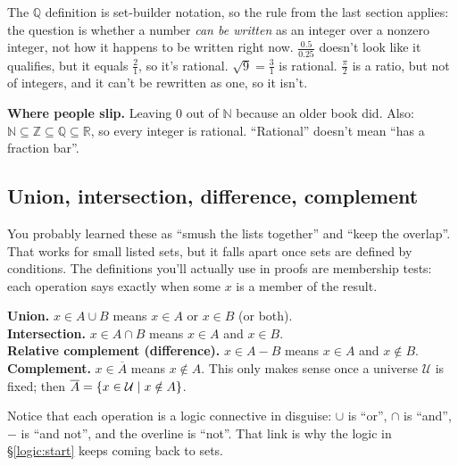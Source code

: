 The $\mathbb{Q}$ definition is set-builder notation, so the rule from the last section applies: the question is whether a number \emph{can be written} as an integer over a nonzero integer, not how it happens to be written right now. $\frac{0.5}{0.25}$ doesn't look like it qualifies, but it equals $\frac21$, so it's rational. $\sqrt9=\frac31$ is rational. $\frac{\pi}{2}$ is a ratio, but not of integers, and it can't be rewritten as one, so it isn't.

\textbf{Where people slip.} Leaving $0$ out of $\mathbb{N}$ because an older book did. Also: $\mathbb{N}\subseteq\mathbb{Z}\subseteq\mathbb{Q}\subseteq\mathbb{R}$, so every integer is rational. ``Rational'' doesn't mean ``has a fraction bar''.

\subsection{Union, intersection, difference, complement}

You probably learned these as ``smush the lists together'' and ``keep the overlap''. That works for small listed sets, but it falls apart once sets are defined by conditions. The definitions you'll actually use in proofs are membership tests: each operation says exactly when some $x$ is a member of the result.

\begin{notebox}
\textbf{Union.} $x\in A\cup B$ means $x\in A$ or $x\in B$ (or both).\\
\textbf{Intersection.} $x\in A\cap B$ means $x\in A$ and $x\in B$.\\
\textbf{Relative complement (difference).} $x\in A-B$ means $x\in A$ and $x\notin B$.\\
\textbf{Complement.} $x\in\overline{A}$ means $x\notin A$. This only makes sense once a universe $\mathcal{U}$ is fixed; then $\overline{A}=\{x\in\mathcal{U}\mathrel{|} x\notin A\}$.
\end{notebox}

Notice that each operation is a logic connective in disguise: $\cup$ is ``or'', $\cap$ is ``and'', $-$ is ``and not'', and the overline is ``not''. That link is why the logic in \S\ref{logic:start} keeps coming back to sets.

